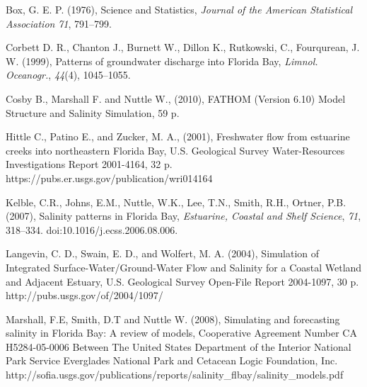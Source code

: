
\begin{thebibliography}{}

Box, G. E. P. (1976), Science and Statistics, \textit{Journal of the American Statistical Association} \textit{71}, 791–799.

Corbett D. R., Chanton J., Burnett W., Dillon K., Rutkowski, C., Fourqurean, J. W. (1999), Patterns of groundwater discharge into Florida Bay, \textit{Limnol. Oceanogr.}, \textit{44}(4), 1045--1055. 

Cosby B., Marshall F. and Nuttle W., (2010), FATHOM (Version 6.10) Model Structure and Salinity Simulation, 59 p. 

Hittle C., Patino E., and Zucker, M. A., (2001), Freshwater flow from estuarine creeks into northeastern Florida Bay, U.S. Geological Survey Water-Resources Investigations Report 2001-4164, 32 p. https://pubs.er.usgs.gov/publication/wri014164

Kelble, C.R., Johns, E.M., Nuttle, W.K., Lee, T.N., Smith, R.H., Ortner, P.B. (2007), Salinity patterns in Florida Bay, \textit{Estuarine, Coastal and Shelf Science}, \textit{71}, 318--334. doi:10.1016/j.ecss.2006.08.006.

Langevin, C. D., Swain, E. D., and Wolfert, M. A. (2004), Simulation of Integrated Surface-Water/Ground-Water Flow and Salinity for a Coastal Wetland and Adjacent Estuary, U.S. Geological Survey Open-File Report 2004-1097, 30 p. http://pubs.usgs.gov/of/2004/1097/

Marshall, F.E, Smith, D.T and Nuttle W. (2008), Simulating and forecasting salinity in Florida Bay: A review of models, Cooperative Agreement Number CA H5284-05-0006 Between The United States Department of the Interior National Park Service Everglades National Park and Cetacean Logic Foundation, Inc. http://sofia.usgs.gov/publications/reports/salinity\_flbay/salinity\_models.pdf


\end{thebibliography}
